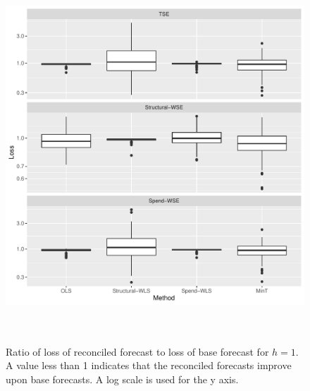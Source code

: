 \documentclass[12pt]{article}
\begin{document}
  	\begin{figure}[!hbt]
  		\centering
  		\small
  		\includegraphics[width = \textwidth, height=14cm]{lossboxplots_2.pdf}
  		\caption{ Ratio of loss of reconciled forecast to loss of base forecast for $h = 1$. A value less than 1 indicates that the reconciled forecasts improve upon base forecasts.  A log scale is used for the y axis.}
  		\label{fig:BaseVSRecon_Fch2}
  	\end{figure}
\end{document}
